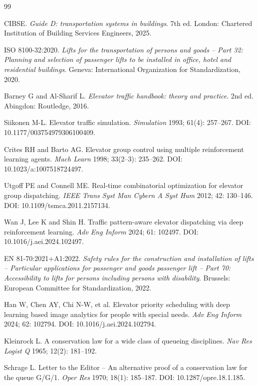 \begin{thebibliography}{99}

CIBSE. \emph{Guide D: transportation systems in buildings}. 7th ed. London: Chartered Institution of Building Services Engineers, 2025.

ISO 8100-32:2020. \emph{Lifts for the transportation of persons and goods -- Part 32: Planning and selection of passenger lifts to be installed in office, hotel and residential buildings}. Geneva: International Organization for Standardization, 2020.

Barney G and Al-Sharif L. \emph{Elevator traffic handbook: theory and practice}. 2nd ed. Abingdon: Routledge, 2016.

Siikonen M-L. Elevator traffic simulation. \emph{Simulation} 1993; 61(4): 257--267. DOI: 10.1177/003754979306100409.

Crites RH and Barto AG. Elevator group control using multiple reinforcement learning agents. \emph{Mach Learn} 1998; 33(2--3): 235--262. DOI: 10.1023/a:1007518724497.

Utgoff PE and Connell ME. Real-time combinatorial optimization for elevator group dispatching. \emph{IEEE Trans Syst Man Cybern A Syst Hum} 2012; 42: 130--146. DOI: 10.1109/tsmca.2011.2157134.

Wan J, Lee K and Shin H. Traffic pattern-aware elevator dispatching via deep reinforcement learning. \emph{Adv Eng Inform} 2024; 61: 102497. DOI: 10.1016/j.aei.2024.102497.

EN 81-70:2021+A1:2022. \emph{Safety rules for the construction and installation of lifts -- Particular applications for passenger and goods passenger lift -- Part 70: Accessibility to lifts for persons including persons with disability}. Brussels: European Committee for Standardization, 2022.

Han W, Chen AY, Chi N-W, et al. Elevator priority scheduling with deep learning based image analytics for people with special needs. \emph{Adv Eng Inform} 2024; 62: 102794. DOI: 10.1016/j.aei.2024.102794.

Kleinrock L. A conservation law for a wide class of queueing disciplines. \emph{Nav Res Logist Q} 1965; 12(2): 181--192.

Schrage L. Letter to the Editor -- An alternative proof of a conservation law for the queue G/G/1. \emph{Oper Res} 1970; 18(1): 185--187. DOI: 10.1287/opre.18.1.185.


\end{thebibliography}
